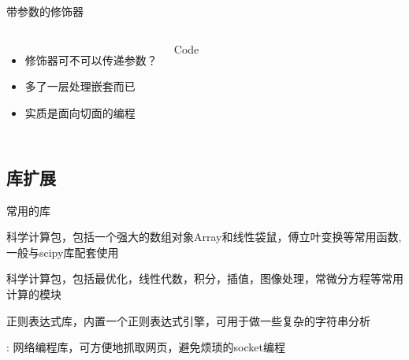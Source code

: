 \documentclass[xcolor=dvipsnames, 9pt]{beamer}
\newenvironment{code}{\begin{semiverbatim} \begin{footnotesize}}{\end{footnotesize}\end{semiverbatim}}
\begin{document}
\begin{frame}[fragile]{带参数的修饰器}
	\begin{columns}
			\begin{itemize}
					\item<2-> 修饰器可不可以传递参数？
						\vspace{0.1cm}
					\item<3-> 多了一层处理嵌套而已
						\vspace{0.1cm}
					\item<4-> 实质是面向切面的编程
			\end{itemize}
		\begin{exampleblock}{Code}\begin{code}
		\end{code}\end{exampleblock}
	\end{columns}
\end{frame}

\subsection{库扩展}
\begin{frame}{常用的库}
	\begin{description}
		\item<2->[numpy] 科学计算包，包括一个强大的数组对象Array和线性袋鼠，傅立叶变换等常用函数, 一般与scipy库配套使用
			\vspace{0.1cm}
		\item<3->[scipy] 科学计算包，包括最优化，线性代数，积分，插值，图像处理，常微分方程等常用计算的模块
			\vspace{0.1cm}
		\item<4->[re] 正则表达式库，内置一个正则表达式引擎，可用于做一些复杂的字符串分析
			\vspace{0.1cm}
		\item<5->[urllib, urllib2]: 网络编程库，可方便地抓取网页，避免烦琐的socket编程
	\end{description}
\end{frame}
\end{document}
